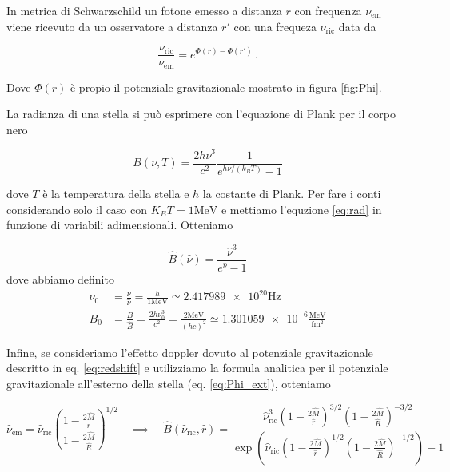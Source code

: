 \documentclass[a4paper, titlepage]{article}
\newcommand{\Sh}[0]{Schwarzschild }
\begin{document}
In metrica di \Sh un fotone emesso a distanza $r$ con frequenza $\nu_\text{em}$ viene ricevuto da un osservatore a distanza $r'$ con una frequeza $\nu_\text{ric}$ data da

\begin{equation}
    \frac{\nu_\text{ric}}{\nu_\text{em}} = e^{\Phi (r) - \Phi (r')} \, .
\label{eq:redshift}
\end{equation}

Dove $\Phi (r)$ è propio il potenziale gravitazionale mostrato in figura \ref{fig:Phi}.

La radianza di una stella si può esprimere con l'equazione di Plank per il corpo nero

\begin{equation}
    B(\nu, T) = \frac{2 h \nu ^3}{c^2} \frac{1}{e^{h \nu / (k_B T)} - 1}
    \label{eq:rad}
\end{equation}

dove $T$ è la temperatura della stella e $h$ la costante di Plank.
Per fare i conti considerando solo il caso con $K_B T = 1 \unit{\mega\electronvolt}$ e mettiamo l'equzione \ref{eq:rad} in funzione di variabili adimensionali. Otteniamo

\begin{equation*}
    \hat B(\hat \nu) = \frac{\hat \nu ^3 }{e^{\hat \nu} - 1}
    \label{eq:rad_ad}
\end{equation*}
dove abbiamo definito
\begin{align*}
    \nu_0 &= \frac{\nu}{\hat \nu} = \frac{h}{1\unit{\mega\electronvolt}} \simeq \num{2.417989e20} \unit{\hertz} \\
    B_0 &= \frac{B}{\hat B} = \frac{2 h \nu_0^3}{c^2} = \frac{2 \unit{\mega\electronvolt}}{(h c)^2} \simeq \num{1.301059e-6} \frac{\unit{\mega\electronvolt}}{\unit{\femto\meter\squared}}
\end{align*}

Infine, se consideriamo l'effetto doppler dovuto al potenziale gravitazionale descritto in eq. \ref{eq:redshift} e utilizziamo la formula analitica per il potenziale gravitazionale all'esterno della stella (eq. \ref{eq:Phi_ext}), otteniamo

\begin{equation}
    \hat \nu_\text{em} = \hat \nu_\text{ric} \left ( \frac{1 - \frac{2 \hat M}{r}}{1 - \frac{2 \hat M}{\hat R}}\right )^{1/2}
    \quad
    \implies
    \quad
    \hat B(\hat \nu_\text{ric}, \hat r) =
    \frac{\hat \nu_\text{ric}^3 \left(1 - \frac{2 \hat M}{\hat r}\right)^{3/2} \left(1 - \frac{2 \hat M}{\hat R}\right)^{-3/2} }
    {\exp( \hat \nu_\text{ric} \left(1 - \frac{2 \hat M}{\hat r} \right)^{1/2} \left(1 - \frac{2 \hat M}{\hat R}\right)^{-1/2} ) - 1}
    \label{eq:B_corr}
\end{equation}
\end{document}
